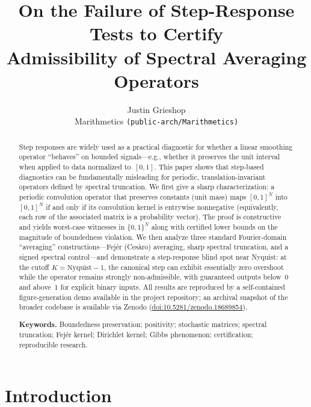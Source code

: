 \documentclass[11pt,a4paper]{article}
\title{%
  \textbf{On the Failure of Step-Response Tests to Certify\\[4pt]
  Admissibility of Spectral Averaging Operators}}
\author{%
  Justin Grieshop\\[2pt]
  \small Marithmetics \texttt{(public-arch/Marithmetics)}}
\date{}
\theoremstyle{plain}
\theoremstyle{definition}
\theoremstyle{plain}
\begin{document}
\maketitle
\thispagestyle{fancy}

\begin{abstract}
Step responses are widely used as a practical diagnostic for whether a linear
smoothing operator ``behaves'' on bounded signals---e.g., whether it preserves
the unit interval when applied to data normalized to~$[0,1]$.  This paper shows
that step-based diagnostics can be fundamentally misleading for periodic,
translation-invariant operators defined by spectral truncation.  We first give a
sharp characterization: a periodic convolution operator that preserves constants
(unit mass) maps $[0,1]^N$ into $[0,1]^N$ if and only if its convolution kernel
is entrywise nonnegative (equivalently, each row of the associated matrix is a
probability vector).  The proof is constructive and yields worst-case witnesses
in $\{0,1\}^N$ along with certified lower bounds on the magnitude of
boundedness violation.  We then analyze three standard Fourier-domain
``averaging'' constructions---Fej\'er (Ces\`aro) averaging, sharp spectral
truncation, and a signed spectral control---and demonstrate a step-response
blind spot near Nyquist: at the cutoff $K = \mathrm{Nyquist}-1$, the canonical
step can exhibit essentially zero overshoot while the operator remains strongly
non-admissible, with guaranteed outputs below~$0$ and above~$1$ for explicit
binary inputs.  All results are reproduced by a self-contained figure-generation
demo available in the project repository; an archival snapshot of the broader
codebase is available via Zenodo
(\href{https://doi.org/10.5281/zenodo.18689854}{doi:10.5281/zenodo.18689854}).

\medskip
\noindent\textbf{Keywords.}\quad
Boundedness preservation; positivity; stochastic matrices; spectral truncation;
Fej\'er kernel; Dirichlet kernel; Gibbs phenomenon; certification; reproducible
research.
\end{abstract}

\bigskip
\tableofcontents
\newpage

\section{Introduction}
\label{sec:intro}
\end{document}
